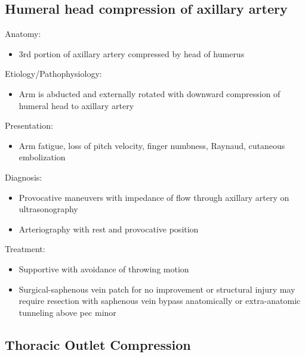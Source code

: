 \documentclass[
]{book}
\providecommand{\tightlist}{%
  \setlength{\itemsep}{0pt}\setlength{\parskip}{0pt}}
\begin{document}
\hypertarget{humeral-head-compression-of-axillary-artery}{%
\subsection{Humeral head compression of axillary artery}\label{humeral-head-compression-of-axillary-artery}}

Anatomy:

\begin{itemize}
\tightlist
\item
  3rd portion of axillary artery compressed by head of humerus
\end{itemize}

Etiology/Pathophysiology:

\begin{itemize}
\tightlist
\item
  Arm is abducted and externally rotated with downward compression of
  humeral head to axillary artery
\end{itemize}

Presentation:

\begin{itemize}
\tightlist
\item
  Arm fatigue, loss of pitch velocity, finger numbness, Raynaud,
  cutaneous embolization
\end{itemize}

Diagnosis:

\begin{itemize}
\item
  Provocative maneuvers with impedance of flow through axillary artery
  on ultrasonography
\item
  Arteriography with rest and provocative position
\end{itemize}

Treatment:

\begin{itemize}
\item
  Supportive with avoidance of throwing motion
\item
  Surgical-saphenous vein patch for no improvement or structural
  injury may require resection with saphenous vein bypass anatomically
  or extra-anatomic tunneling above pec minor
\end{itemize}

\hypertarget{thoracic-outlet-compression}{%
\subsection{Thoracic Outlet Compression}\label{thoracic-outlet-compression}}
\end{document}
